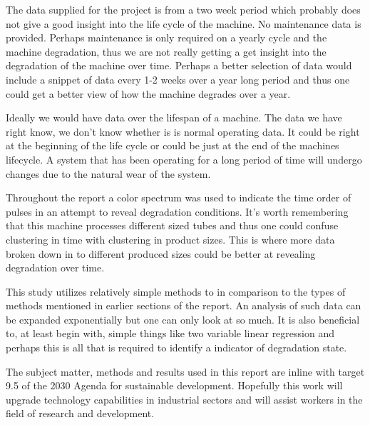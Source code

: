 \documentclass[]{article}
\begin{document}
The data supplied for the project is from a two week period which probably does not give a good insight into the life cycle of the machine. No maintenance data is provided. Perhaps maintenance is only required on a yearly cycle and the machine degradation, thus we are not really getting a get insight into the degradation of the machine over time. Perhaps a better selection of data would include a snippet of data every 1-2 weeks over a year long period and thus one could get a better view of how the machine degrades over a year.

Ideally we would have data over the lifespan of a machine. The data we have right know, we don't know whether is is normal operating data. It could be right at the beginning of the life cycle or could be just at the end of the machines lifecycle. A system that has been operating for a long period of time will undergo changes due to the natural wear of the system.

Throughout the report a color spectrum was used to indicate the time order of pulses in an attempt to reveal degradation conditions. It's worth remembering that this machine processes different sized tubes and thus one could confuse clustering in time with clustering in product sizes. This is where more data broken down in to different produced sizes could be better at revealing degradation over time.

This study utilizes relatively simple methods to in comparison to the types of methods mentioned in earlier sections of the report. An analysis of such data can be expanded exponentially but one can only look at so much. It is also beneficial to, at least begin with, simple things like two variable linear regression and perhaps this is all that is required to identify a indicator of degradation state.

The subject matter, methods and results used in this report are inline with target 9.5 of the 2030 Agenda for sustainable development\cite{united2015department}. Hopefully this work will upgrade technology capabilities in industrial sectors and will assist workers in the field of research and development. 
\end{document}
